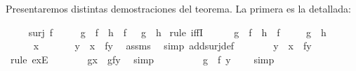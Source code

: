 \begin{isabellebody}
\begin{isamarkuptext}
Presentaremos distintas demostraciones del teorema. La primera es la
 detallada:%
\end{isamarkuptext}\isamarkuptrue%
\isamarkupfalse%
\ \isanewline
\ \ \ {\isachardoublequoteopen}surj\ f{\isachardoublequoteclose}\ \isanewline
\ \ \ {\isachardoublequoteopen}{\isacharparenleft}\ g\ {\isasymcirc}\ f\ {\isacharequal}\ h\ {\isasymcirc}\ f\ {\isacharparenright}\ {\isacharequal}\ {\isacharparenleft}g\ {\isacharequal}\ h{\isacharparenright}{\isachardoublequoteclose}\isanewline
%
\isadelimproof
%
\endisadelimproof
%
\isatagproof
{}\isamarkupfalse%
\ {\isacharparenleft}rule\ iffI{\isacharparenright}\isanewline
\ \ \isamarkupfalse%
\ {}{\isacharcolon}\ {\isachardoublequoteopen}\ g\ {\isasymcirc}\ f\ {\isacharequal}\ h\ {\isasymcirc}\ f\ {\isachardoublequoteclose}\isanewline
\ \ \isamarkupfalse%
\ {\isachardoublequoteopen}g\ {\isacharequal}\ h{\isachardoublequoteclose}\ \isanewline
\ \ \isamarkupfalse%
\ \isanewline
\ \ \ \ \isamarkupfalse%
\ x\isanewline
\isanewline
\ \ \ \ \isamarkupfalse%
\ {\isachardoublequoteopen}\ {\isasymexists}y\ {\isachardot}\ x\ {\isacharequal}\ f{\isacharparenleft}y{\isacharparenright}{\isachardoublequoteclose}\ \isamarkupfalse%
\ assms\ \isamarkupfalse%
\ {\isacharparenleft}simp\ add{\isacharcolon}surj{\isacharunderscore}def{\isacharparenright}\isanewline
\ \ \ \ \isamarkupfalse%
\ \isamarkupfalse%
\ {\isachardoublequoteopen}y{\isachardoublequoteclose}\ \ {}{\isacharcolon}{\isachardoublequoteopen}x\ {\isacharequal}\ f{\isacharparenleft}y{\isacharparenright}{\isachardoublequoteclose}\ \isamarkupfalse%
\ {\isacharparenleft}rule\ exE{\isacharparenright}\isanewline
\ \ \ \ \isamarkupfalse%
\ \isamarkupfalse%
\ {\isachardoublequoteopen}g{\isacharparenleft}x{\isacharparenright}\ {\isacharequal}\ g{\isacharparenleft}f{\isacharparenleft}y{\isacharparenright}{\isacharparenright}{\isachardoublequoteclose}\ \isamarkupfalse%
\ simp\isanewline
\ \ \ \ \isamarkupfalse%
\ \isamarkupfalse%
\ {\isachardoublequoteopen}{\isachardot}{\isachardot}{\isachardot}\ {\isacharequal}\ {\isacharparenleft}g\ {\isasymcirc}\ f{\isacharparenright}\ {\isacharparenleft}y{\isacharparenright}\ \ {\isachardoublequoteclose}\ \isamarkupfalse%
\ simp\isanewline
\ \ \ \ \isamarkupfalse%

\end{isabellebody}
